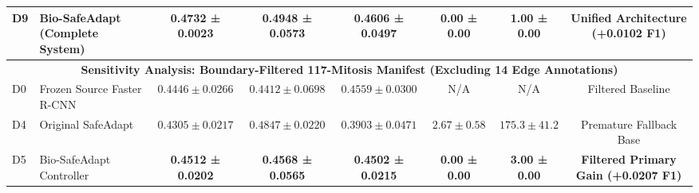 \documentclass[conference]{IEEEtran}
\begin{document}
\begin{table}[t]
{\begin{tabular}{llcccccc}
D9 & \textbf{Bio-SafeAdapt (Complete System)} & \textbf{0.4732 ± 0.0023} & \textbf{0.4948 ± 0.0573} & \textbf{0.4606 ± 0.0497} & \textbf{0.00 ± 0.00} & \textbf{1.00 ± 0.00} & \textbf{Unified Architecture (+0.0102 F1)} \\
\midrule
\multicolumn{8}{c}{\textbf{Sensitivity Analysis: Boundary-Filtered 117-Mitosis Manifest (Excluding 14 Edge Annotations)}} \\
\midrule
D0 & Frozen Source Faster R-CNN & $0.4446 \pm 0.0266$ & $0.4412 \pm 0.0698$ & $0.4559 \pm 0.0300$ & N/A & N/A & Filtered Baseline \\
D4 & Original SafeAdapt & $0.4305 \pm 0.0217$ & $0.4847 \pm 0.0220$ & $0.3903 \pm 0.0471$ & $2.67 \pm 0.58$ & $175.3 \pm 41.2$ & Premature Fallback Base \\
D5 & Bio-SafeAdapt Controller & \textbf{0.4512 ± 0.0202} & \textbf{0.4568 ± 0.0565} & \textbf{0.4502 ± 0.0215} & \textbf{0.00 ± 0.00} & \textbf{3.00 ± 0.00} & \textbf{Filtered Primary Gain (+0.0207 F1)} \\
\bottomrule
\end{tabular}%
}
\end{table}
\end{document}
